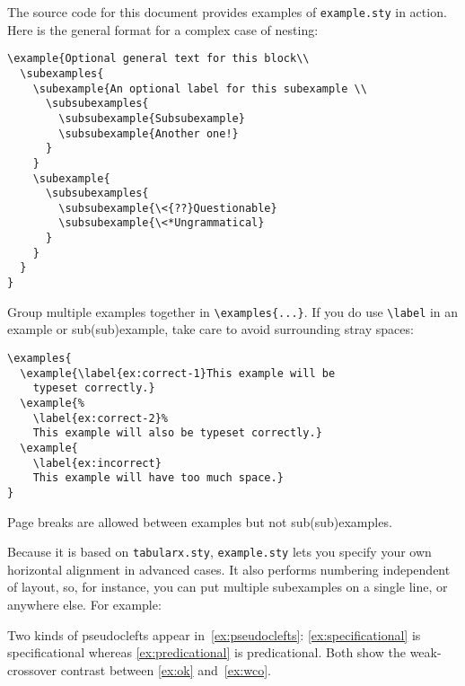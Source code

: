 \documentclass[lucida,final]{sp}
\newcommand{\spfile}[1]{\texttt{#1}}
\newcommand{\cmd}[1]{\texttt{\textbackslash#1}}
\begin{document}
The source code for this document provides examples of
\spfile{example.sty} in action.  Here is the general format for a
complex case of nesting:
%
\begin{Verbatim}
\example{Optional general text for this block\\
  \subexamples{
    \subexample{An optional label for this subexample \\
      \subsubexamples{
        \subsubexample{Subsubexample}
        \subsubexample{Another one!}
      }
    }
    \subexample{
      \subsubexamples{
        \subsubexample{\<{??}Questionable}
        \subsubexample{\<*Ungrammatical}
      }
    }
  }
}
\end{Verbatim}
%
Group multiple examples together in \verb+\examples{...}+.  If you do
use \cmd{label} in an example or sub(sub)example, take care to avoid
surrounding stray spaces:
%
\begin{Verbatim}
\examples{
  \example{\label{ex:correct-1}This example will be
    typeset correctly.}
  \example{%
    \label{ex:correct-2}%
    This example will also be typeset correctly.}
  \example{
    \label{ex:incorrect}
    This example will have too much space.}
}
\end{Verbatim}
%
Page breaks are allowed between examples but not sub(sub)examples.

Because it is based on \spfile{tabularx.sty}, \spfile{example.sty}
lets you specify your own horizontal alignment in advanced cases.  It
also performs numbering independent of layout, so, for instance, you
can put multiple subexamples on a single line, or anywhere else.  For
example:

Two kinds of pseudoclefts appear in~\eqref{ex:pseudoclefts}:
\eqref{ex:specificational} is specificational whereas
\eqref{ex:predicational} is predicational.
Both show the weak-crossover contrast between
\eqref{ex:ok} and~\eqref{ex:wco}.
\end{document}
